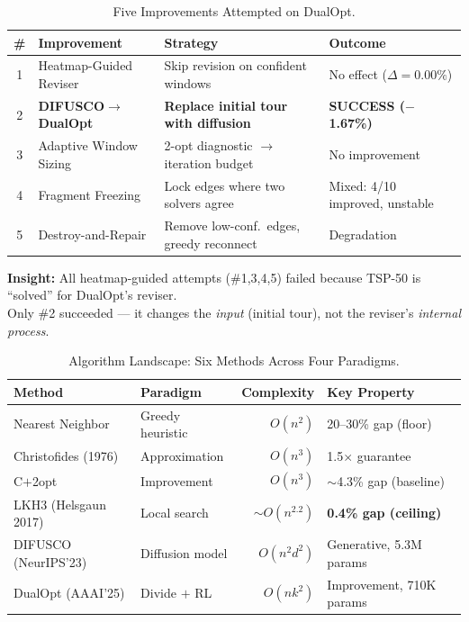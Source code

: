 \documentclass[10pt]{article}
\begin{document}
\begin{table}[h]
\centering
\caption{Five Improvements Attempted on DualOpt.}
\label{tab:improvements}
\small
\begin{tabular}{@{}clll@{}}
\toprule
\textbf{\#} & \textbf{Improvement} & \textbf{Strategy} & \textbf{Outcome} \\
\midrule
1 & Heatmap-Guided Reviser   & Skip revision on confident windows    & No effect ($\Delta\!=\!0.00\%$) \\
2 & \textbf{DIFUSCO$\rightarrow$DualOpt} & \textbf{Replace initial tour with diffusion} & \textbf{\textcolor{bestgreen}{SUCCESS ($-$1.67\%)}} \\
3 & Adaptive Window Sizing   & 2-opt diagnostic $\rightarrow$ iteration budget & No improvement \\
4 & Fragment Freezing        & Lock edges where two solvers agree     & Mixed: 4/10 improved, unstable \\
5 & Destroy-and-Repair       & Remove low-conf.\ edges, greedy reconnect  & Degradation \\
\bottomrule
\end{tabular}

\vspace{2pt}
{\footnotesize \textbf{Insight:} All heatmap-guided attempts (\#1,3,4,5) failed because TSP-50 is ``solved'' for DualOpt's reviser.}\\
{\footnotesize Only \#2 succeeded — it changes the \textit{input} (initial tour), not the reviser's \textit{internal process}.}
\end{table}


\begin{table}[h]
\centering
\caption{Algorithm Landscape: Six Methods Across Four Paradigms.}
\label{tab:overview}
\small
\begin{tabular}{@{}llrl@{}}
\toprule
\textbf{Method} & \textbf{Paradigm} & \textbf{Complexity} & \textbf{Key Property} \\
\midrule
Nearest Neighbor       & Greedy heuristic   & $O(n^2)$     & 20--30\% gap (floor) \\
Christofides (1976)    & Approximation      & $O(n^3)$     & 1.5$\times$ guarantee \\
C$+$2opt               & Improvement        & $O(n^3)$     & $\sim$4.3\% gap (baseline) \\
LKH3 (Helsgaun 2017)   & Local search       & $\sim\!O(n^{2.2})$ & \textbf{0.4\% gap (ceiling)} \\
\midrule
DIFUSCO (NeurIPS'23)   & Diffusion model    & $O(n^2 d^2)$ & Generative, 5.3M params \\
DualOpt (AAAI'25)      & Divide $+$ RL      & $O(n k^2)$   & Improvement, 710K params \\
\bottomrule
\end{tabular}
\end{table}
\end{document}
